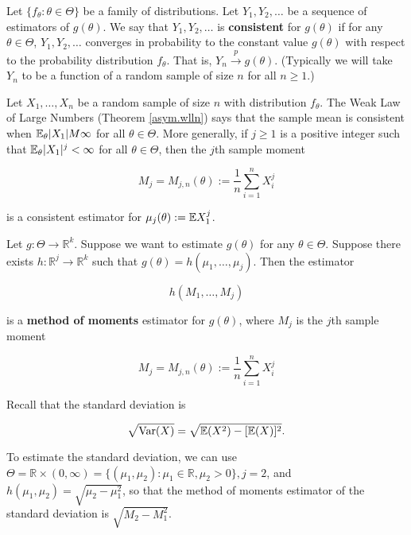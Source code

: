 \begin{definition} Let \(\{f_\theta: \theta \in \Theta\}\) be a family of distributions. Let \(Y_1, Y_2, \ldots\) be a sequence of estimators of \(g(\theta)\). We say that \(Y_1, Y_2, \ldots\) is \textbf{consistent} for \(g(\theta)\) if for any \(\theta \in \Theta\), \(Y_1, Y_2, \ldots\) converges in probability to the constant value \(g(\theta)\) with respect to the probability distribution \(f_\theta\). That is, \(Y_n \xrightarrow{p} g(\theta)\). (Typically we will take \(Y_n\) to be a function of a random sample of size \(n\) for all \(n \geq 1\).) 

\end{definition}

\begin{example} Let \(X_1, \ldots, X_n\) be a random sample of size \(n\) with distribution \(f_\theta\). The Weak Law of Large Numbers (Theorem \ref{asym.wlln}) says that the sample mean is consistent when \(\E_\theta |X_1| M \infty\) for all \(\theta \in \Theta\). More generally, if \(j \geq 1\) is a positive integer such that \(\E_\theta |X_1|^j < \infty\) for all \(\theta \in \Theta\), then the \(j\)th sample moment

\[
M_j = M_{j,n}(\theta) := \frac{1}{n} \sum_{i=1}^n X_i^j
\]

is a consistent estimator for \(\mu_j(\theta) := \E X_1^j\).

\end{example}

\begin{definition} Let \(g:\Theta \to \mathbb{R}^k\). Suppose we want to estimate \(g(\theta)\) for any \(\theta \in \Theta\). Suppose there exists \(h: \mathbb{R}^j \to \mathbb{R}^k\) such that \(g(\theta) = h(\mu_1, \ldots, \mu_j)\). Then the estimator

\[
h(M_1, \ldots, M_j)
\]

is a \textbf{method of moments} estimator for \(g(\theta)\), where \(M_j\) is the \(j\)th sample moment

\[
M_j = M_{j,n}(\theta) := \frac{1}{n} \sum_{i=1}^n X_i^j
\]

\end{definition}

\begin{example} Recall that the standard deviation is

\[
\sqrt{\Var(X)} = \sqrt{\E(X^2) - [\E(X)]^2}.
\]

To estimate the standard deviation, we can use \(\Theta = \mathbb{R} \times (0, \infty) = \{(\mu_1, \mu_2): \mu_1 \in \mathbb{R}, \mu_2 > 0\}, j=2\), and \(h(\mu_1, \mu_2) = \sqrt{\mu_2 - \mu_1^2}\), so that the method of moments estimator of the standard deviation is \(\sqrt{M_2 - M_1^2}\).

\end{example}

